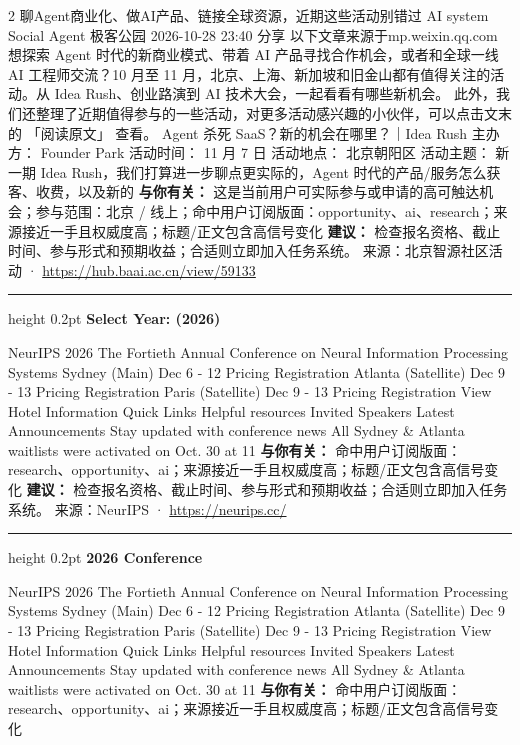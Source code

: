 \documentclass[10.5pt]{ctexart}
\begin{document}
\begin{multicols}{2}
聊Agent商业化、做AI产品、链接全球资源，近期这些活动别错过 AI system Social Agent 极客公园 2026-10-28 23:40 分享 以下文章来源于mp.weixin.qq.com 想探索 Agent 时代的新商业模式、带着 AI 产品寻找合作机会，或者和全球一线 AI 工程师交流？10 月至 11 月，北京、上海、新加坡和旧金山都有值得关注的活 动。从 Idea Rush、创业路演到 AI 技术大会，一起看看有哪些新机会。 此外，我们还整理了近期值得参与的一些活动，对更多活动感兴趣的小伙伴，可以点击文末的 「阅读原文」 查看。 Agent 杀死 SaaS？新的机会在哪里？｜Idea Rush 主办方： Founder Park 活动时间： 11 月 7 日 活动地点： 北京朝阳区 活动主题： 新一期 Idea Rush，我们打算进一步聊点更实际的，Agent 时代的产品/服务怎么获客、收费，以及新的
\textbf{与你有关：} 这是当前用户可实际参与或申请的高可触达机会；参与范围：北京 / 线上；命中用户订阅版面：opportunity、ai、research；来源接近一手且权威度高；标题/正文包含高信号变化
\textbf{建议：} 检查报名资格、截止时间、参与形式和预期收益；合适则立即加入任务系统。
{\footnotesize\color{ormuted} 来源：北京智源社区活动 · \url{https://hub.baai.ac.cn/view/59133}}
\vspace{2mm}
\hrule height 0.2pt
\vspace{2mm}
{\large\bfseries Select Year: (2026)}\par
NeurIPS 2026 The Fortieth Annual Conference on Neural Information Processing Systems Sydney (Main) Dec 6 - 12 Pricing Registration Atlanta (Satellite) Dec 9 - 13 Pricing Registration Paris (Satellite) Dec 9 - 13 Pricing Registration View Hotel Information Quick Links Helpful resources Invited Speakers Latest Announcements Stay updated with conference news All Sydney \& Atlanta waitlists were activated on Oct. 30 at 11
\textbf{与你有关：} 命中用户订阅版面：research、opportunity、ai；来源接近一手且权威度高；标题/正文包含高信号变化
\textbf{建议：} 检查报名资格、截止时间、参与形式和预期收益；合适则立即加入任务系统。
{\footnotesize\color{ormuted} 来源：NeurIPS · \url{https://neurips.cc/}}
\vspace{2mm}
\hrule height 0.2pt
\vspace{2mm}
{\large\bfseries 2026 Conference}\par
NeurIPS 2026 The Fortieth Annual Conference on Neural Information Processing Systems Sydney (Main) Dec 6 - 12 Pricing Registration Atlanta (Satellite) Dec 9 - 13 Pricing Registration Paris (Satellite) Dec 9 - 13 Pricing Registration View Hotel Information Quick Links Helpful resources Invited Speakers Latest Announcements Stay updated with conference news All Sydney \& Atlanta waitlists were activated on Oct. 30 at 11
\textbf{与你有关：} 命中用户订阅版面：research、opportunity、ai；来源接近一手且权威度高；标题/正文包含高信号变化

\end{multicols}
\end{document}
